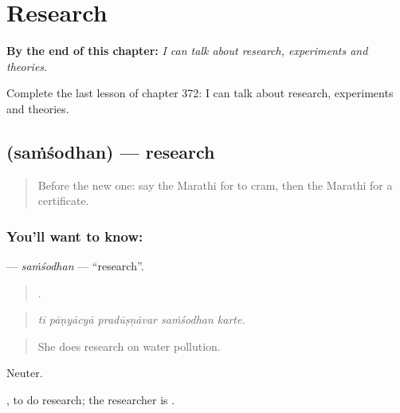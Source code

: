 
\chapter{Research}
\label{ch:mr-research}

\begin{chapteropening}
\textbf{By the end of this chapter:} \emph{I can talk about research, experiments and theories.}

Complete the last lesson of chapter 372: I can talk about research, experiments and theories.
\end{chapteropening}

\section[\texorpdfstring{\mr{संशोधन} (saṁśodhan)}{संशोधन (saṁśodhan)}]{ (saṁśodhan) — research}

\label{lesson:MR-C372-samsodhan}



\begin{quote}
Before the new one: say the Marathi for to cram, then the Marathi for a certificate.
\end{quote}

\subsection*{You'll want to know: }
\textbf{} — \emph{saṁśodhan} — \textquotedblleft{}research\textquotedblright{}.

\begin{quote}
    .
\end{quote}

\begin{quote}
\emph{tī pāṇyācyā pradūṣṇāvar saṁśodhan karte.}
\end{quote}

\begin{quote}
She does research on water pollution.
\end{quote}

Neuter.

 , to do research; the researcher is .

